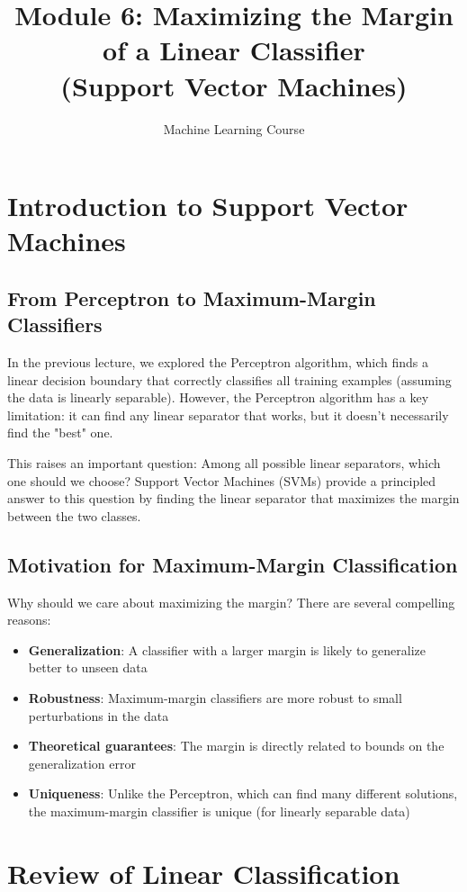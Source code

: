 \documentclass{article}
\title{Module 6: Maximizing the Margin of a Linear Classifier\\(Support Vector Machines)}
\author{Machine Learning Course}
\date{}
\begin{document}
\maketitle
\tableofcontents
\newpage

\section{Introduction to Support Vector Machines}

\subsection{From Perceptron to Maximum-Margin Classifiers}
In the previous lecture, we explored the Perceptron algorithm, which finds a linear decision boundary that correctly classifies all training examples (assuming the data is linearly separable). However, the Perceptron algorithm has a key limitation: it can find any linear separator that works, but it doesn't necessarily find the "best" one.

This raises an important question: Among all possible linear separators, which one should we choose? Support Vector Machines (SVMs) provide a principled answer to this question by finding the linear separator that maximizes the margin between the two classes.

\subsection{Motivation for Maximum-Margin Classification}
Why should we care about maximizing the margin? There are several compelling reasons:

\begin{itemize}
    \item \textbf{Generalization}: A classifier with a larger margin is likely to generalize better to unseen data
    \item \textbf{Robustness}: Maximum-margin classifiers are more robust to small perturbations in the data
    \item \textbf{Theoretical guarantees}: The margin is directly related to bounds on the generalization error
    \item \textbf{Uniqueness}: Unlike the Perceptron, which can find many different solutions, the maximum-margin classifier is unique (for linearly separable data)
\end{itemize}

\section{Review of Linear Classification}
\end{document}
